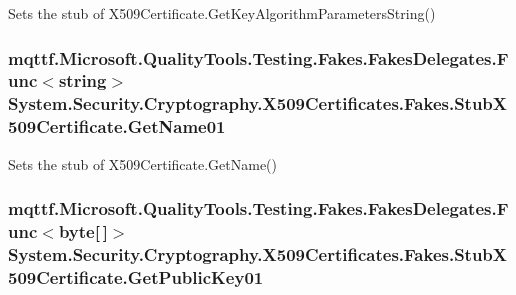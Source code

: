 Sets the stub of X509\-Certificate.\-Get\-Key\-Algorithm\-Parameters\-String()

\hypertarget{class_system_1_1_security_1_1_cryptography_1_1_x509_certificates_1_1_fakes_1_1_stub_x509_certificate_a60c52e63880e6b5c003e252eff40c149}{
\subsubsection[{Get\-Name01}]{\setlength{\rightskip}{0pt plus 5cm}mqttf.\-Microsoft.\-Quality\-Tools.\-Testing.\-Fakes.\-Fakes\-Delegates.\-Func$<$string$>$ System.\-Security.\-Cryptography.\-X509\-Certificates.\-Fakes.\-Stub\-X509\-Certificate.\-Get\-Name01}}\label{class_system_1_1_security_1_1_cryptography_1_1_x509_certificates_1_1_fakes_1_1_stub_x509_certificate_a60c52e63880e6b5c003e252eff40c149}


Sets the stub of X509\-Certificate.\-Get\-Name()

\hypertarget{class_system_1_1_security_1_1_cryptography_1_1_x509_certificates_1_1_fakes_1_1_stub_x509_certificate_abd76a7a1ed6009a3acf436fdab5a49a0}{
\subsubsection[{Get\-Public\-Key01}]{\setlength{\rightskip}{0pt plus 5cm}mqttf.\-Microsoft.\-Quality\-Tools.\-Testing.\-Fakes.\-Fakes\-Delegates.\-Func$<$byte\mbox{[}$\,$\mbox{]}$>$ System.\-Security.\-Cryptography.\-X509\-Certificates.\-Fakes.\-Stub\-X509\-Certificate.\-Get\-Public\-Key01}}\label{class_system_1_1_security_1_1_cryptography_1_1_x509_certificates_1_1_fakes_1_1_stub_x509_certificate_abd76a7a1ed6009a3acf436fdab5a49a0}


